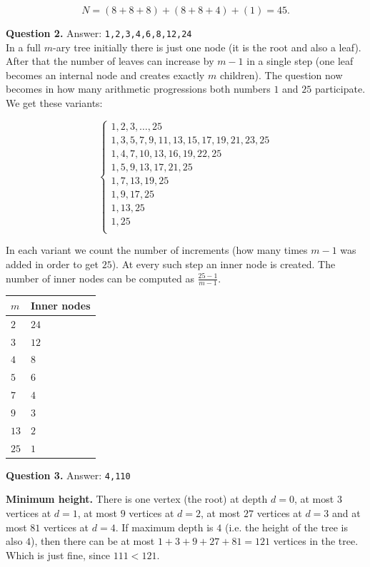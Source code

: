 \documentclass[jou]{apa6}
\begin{document}
$$N = (8 + 8 + 8) + (8 + 8 + 4) + (1) = 45.$$


\vspace{4pt}
{\bf Question 2.} Answer: {\tt 1,2,3,4,6,8,12,24} \\
In a full $m$-ary tree initially there is just one 
node (it is the root and also a leaf). After that
the number of leaves can increase by $m-1$ in a single step 
(one leaf becomes an internal node and creates exactly $m$ children). 
The question now becomes \textendash{} in how many arithmetic
progressions both numbers $1$ and $25$ participate. 
We get these variants:

$$\left\{ \begin{array}{l}
1,2,3,\ldots,25 \\
1,3,5,7,9,11,13,15,17,19,21,23,25 \\
1,4,7,10,13,16,19,22,25 \\
1,5,9,13,17,21,25 \\
1,7,13,19,25 \\
1,9,17,25 \\
1,13,25 \\
1,25 \\
\end{array} \right.$$

In each variant we count the number of increments
(how many times $m-1$ was added in order to get $25$). At every such step 
an inner node is created.
The number of inner nodes can be computed as $\frac{25-1}{m-1}$. 

\begin{tabular}{|l|l|} \hline
$m$ & Inner nodes \\ \hline
$2$ & $24$ \\ \hline
$3$ & $12$ \\ \hline
$4$ & $8$ \\ \hline
$5$ & $6$ \\ \hline
$7$ & $4$ \\ \hline
$9$ & $3$ \\ \hline
$13$ & $2$ \\ \hline
$25$ & $1$ \\ \hline
\end{tabular}





\vspace{4pt}
{\bf Question 3.} Answer: {\tt 4,110}

{\bf Minimum height.} There is one vertex (the root) at depth $d=0$, 
at most $3$ vertices at $d=1$, at most $9$ vertices at $d=2$, 
at most $27$ vertices at $d=3$ and at most $81$ vertices at $d=4$. 
If maximum depth is $4$ (i.e. the height of the tree is also $4$), then 
there can be at most $1 + 3 + 9 + 27 + 81 = 121$
vertices in the tree. Which is just fine, since $111 < 121$. 
\end{document}
